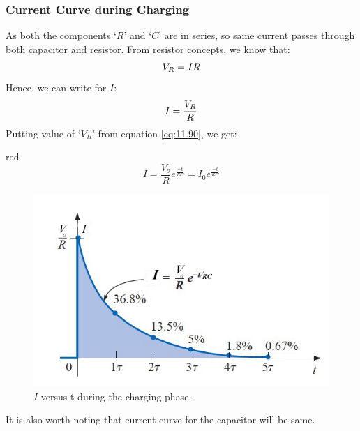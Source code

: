 \subsubsection{Current Curve during Charging}
As both the components `$R$' and `$C$' are in series, so same current
passes through both capacitor and resistor. From resistor concepts, we know
that:
\begin{equation}\notag
  V_{R} = IR
\end{equation}
Hence, we can write for $I$:
\begin{equation}\notag
  I = \frac{V_{R}}{R}
\end{equation}
Putting value of `$V_{R}$' from equation \ref{eq:11.90}, we get:
\begin{mybox}{red}{}
  \begin{equation}\label{11.91}
    I  = \frac{V_{o}}{R}e^{\frac{-t}{RC}} = I_{0}e^{\frac{-t}{RC}}
  \end{equation}
  \end{mybox}
\begin{figure}[H]
    \centering
    \includegraphics[scale = 0.4]{Images/Chapter-11/11.39}
    \caption{$I$ versus t during the charging phase.}
    \label{fig:11.40}
\end{figure}
It is also worth noting that current curve for the capacitor will be same.
